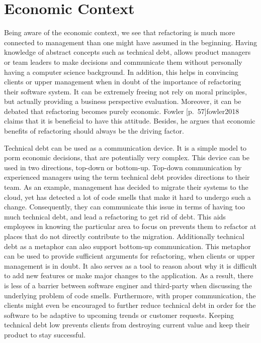 \section{Economic Context}
Being aware of the economic context, 
	we see that refactoring is much more connected to management than one
	might have assumed in the beginning. 
Having knowledge of abstract concepts such as technical debt,
	allows product managers or team leaders 
	to make decisions and communicate them without personally 
	having a computer science background. 
In addition, 
	this helps in convincing clients or upper management 
	when in doubt of the importance of refactoring their software system.
It can be extremely freeing not rely on moral principles, 
	but actually providing a business perspective evaluation.
Moreover, it can be debated that refactoring becomes purely economic.
Fowler [p.~57]{fowler2018} claims 
	that it is beneficial to have this attitude. 
Besides, he argues that economic benefits of refactoring 
	should always be the driving factor.

Technical debt can be used as a communication device. 
It is a simple model to porm economic decisions, 
	that are potentially very complex.
This device can be used in two directions, top-down or bottom-up.
Top-down communication by experienced managers 
	using the term technical debt provides directions to their team.
As an example, management has decided to migrate their systems to the cloud, 
	yet has detected a lot of code smells 
	that make it hard to undergo such a change. 
Consequently, they can communicate this issue in terms of 
	having too much technical debt, and lead a refactoring to get rid of debt.
This aids employees in knowing the particular area 
	to focus on prevents them to refactor at places 
	that do not directly contribute to the migration.
Additionally technical debt as a metaphor 
	can also support bottom-up communication.
This metaphor can be used to provide sufficient arguments for refactoring, 
	when clients or upper management is in doubt.
It also serves as a tool to reason about 
	why it is difficult to add new features or 
	make major changes to the application. 
As a result, there is less of a barrier between 
	software enginer and third-party when discussing the 
	underlying problem of code smells. 
Furthermore, with proper communication, 
	the clients might even be encouraged to further reduce 
	technical debt in order for the software to be adaptive to 
	upcoming trends or customer requests. 
Keeping technical debt low prevents clients from destroying current value 
	and keep their product to stay successful.
